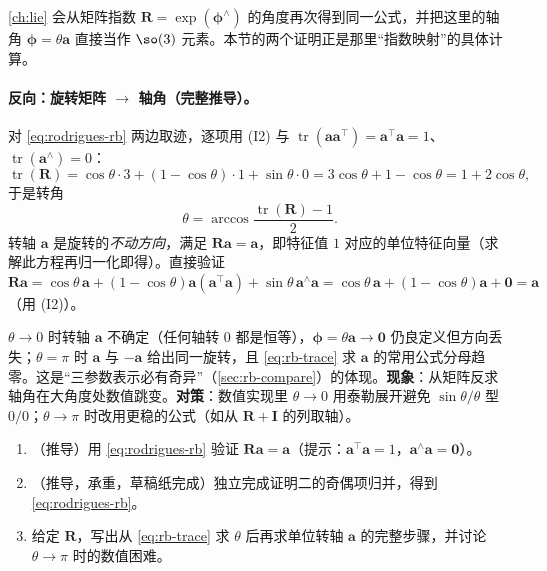 \begin{note}
\cref{ch:lie} 会从矩阵指数 $\mathbf{R}=\exp(\boldsymbol{\phi}^\wedge)$ 的角度再次得到同一公式，并把这里的轴角 $\boldsymbol{\phi}=\theta\mathbf{a}$ 直接当作 $\so(3)$ 元素。本节的两个证明正是那里“指数映射”的具体计算。
\end{note}

\paragraph{反向：旋转矩阵 $\to$ 轴角（完整推导）。}对 \cref{eq:rodrigues-rb} 两边取迹，逐项用 (I2) 与 $\operatorname{tr}(\mathbf{a}\mathbf{a}^\top)=\mathbf{a}^\top\mathbf{a}=1$、$\operatorname{tr}(\mathbf{a}^\wedge)=0$：
\begin{equation}
  \operatorname{tr}(\mathbf{R})=\cos\theta\cdot3+(1-\cos\theta)\cdot1+\sin\theta\cdot0=3\cos\theta+1-\cos\theta=1+2\cos\theta,
  \label{eq:rb-tracefull}
\end{equation}
于是转角
\begin{equation}
  \theta=\arccos\frac{\operatorname{tr}(\mathbf{R})-1}{2}.
  \label{eq:rb-trace}
\end{equation}
转轴 $\mathbf{a}$ 是旋转的\emph{不动方向}，满足 $\mathbf{R}\mathbf{a}=\mathbf{a}$，即特征值 $1$ 对应的单位特征向量（求解此方程再归一化即得）。直接验证 $\mathbf{R}\mathbf{a}=\cos\theta\,\mathbf{a}+(1-\cos\theta)\mathbf{a}(\mathbf{a}^\top\mathbf{a})+\sin\theta\,\mathbf{a}^\wedge\mathbf{a}=\cos\theta\,\mathbf{a}+(1-\cos\theta)\mathbf{a}+\mathbf{0}=\mathbf{a}$（用 (I2)）。

\begin{pitfall}[思维陷阱：轴角在 $\theta=0,\pi$ 附近的退化]
$\theta\to0$ 时转轴 $\mathbf{a}$ 不确定（任何轴转 $0$ 都是恒等），$\boldsymbol{\phi}=\theta\mathbf{a}\to\mathbf{0}$ 仍良定义但方向丢失；$\theta=\pi$ 时 $\mathbf{a}$ 与 $-\mathbf{a}$ 给出同一旋转，且 \cref{eq:rb-trace} 求 $\mathbf{a}$ 的常用公式分母趋零。这是“三参数表示必有奇异”（\cref{sec:rb-compare}）的体现。\textbf{现象}：从矩阵反求轴角在大角度处数值跳变。\textbf{对策}：数值实现里 $\theta\to0$ 用泰勒展开避免 $\sin\theta/\theta$ 型 $0/0$；$\theta\to\pi$ 时改用更稳的公式（如从 $\mathbf{R}+\mathbf{I}$ 的列取轴）。
\end{pitfall}

\begin{practice}
\begin{enumerate}
  \item （推导）用 \cref{eq:rodrigues-rb} 验证 $\mathbf{R}\mathbf{a}=\mathbf{a}$（提示：$\mathbf{a}^\top\mathbf{a}=1$，$\mathbf{a}^\wedge\mathbf{a}=\mathbf{0}$）。
  \item （推导，承重，草稿纸完成）独立完成证明二的奇偶项归并，得到 \cref{eq:rodrigues-rb}。
  \item 给定 $\mathbf{R}$，写出从 \cref{eq:rb-trace} 求 $\theta$ 后再求单位转轴 $\mathbf{a}$ 的完整步骤，并讨论 $\theta\to\pi$ 时的数值困难。
\end{enumerate}
\end{practice}

